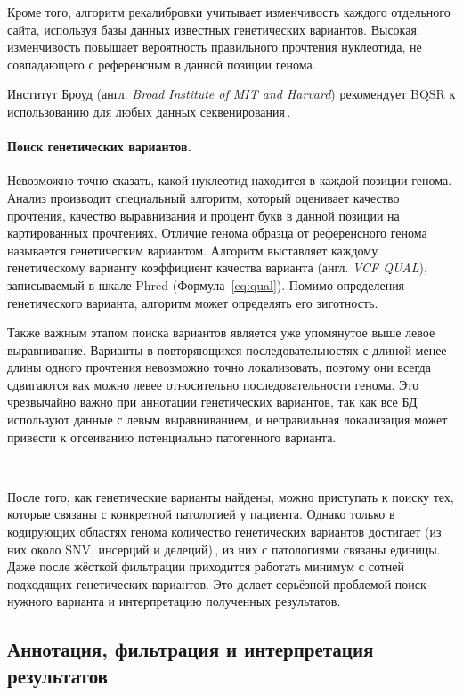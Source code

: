 \documentclass[a4paper,14pt]{extarticle}
\newcommand{\thousands}{тыс.}
\newcommand{\formularef}[1]{Формула~\ref{#1}}
\newcommand{\engterm}[1]{англ. \textenglish{\textit{#1}}}
\begin{document}
Кроме того, алгоритм рекалибровки учитывает изменчивость каждого отдельного сайта, используя базы данных известных генетических вариантов.
Высокая изменчивость повышает вероятность правильного прочтения нуклеотида, не совпадающего с референсным в данной позиции генома.

Институт Броуд (\engterm{Broad Institute of MIT and Harvard}) рекомендует BQSR к использованию для любых данных секвенирования\,\citep{Auwera_2013}.

\paragraph{Поиск генетических вариантов.}
Невозможно точно сказать, какой нуклеотид находится в каждой позиции генома.
Анализ производит специальный алгоритм, который оценивает качество прочтения, качество выравнивания и процент букв в данной позиции на картированных прочтениях.
Отличие генома образца от референсного генома называется генетическим вариантом.
Алгоритм выставляет каждому генетическому варианту коэффициент качества варианта (\engterm{VCF QUAL}), записываемый в шкале Phred (\formularef{eq:qual}).
Помимо определения генетического варианта, алгоритм может определять его зиготность.

Также важным этапом поиска вариантов является уже упомянутое выше левое выравнивание.
Варианты в повторяющихся последовательностях с длиной менее длины одного прочтения невозможно точно локализовать, поэтому они всегда сдвигаются как можно левее относительно последовательности генома.
Это чрезвычайно важно при аннотации генетических вариантов, так как все БД используют данные с левым выравниванием, и неправильная локализация может привести к отсеиванию потенциально патогенного варианта.

~

После того, как генетические варианты найдены, можно приступать к поиску тех, которые связаны с конкретной патологией у пациента.
Однако только в кодирующих областях генома количество генетических вариантов достигает \numprint[\thousands]{100} (из них около  SNV,  инсерций и  делеций)\,\citep{Supernat_2018}, из них с патологиями связаны единицы.
Даже после жёсткой фильтрации приходится работать минимум с сотней подходящих генетических вариантов.
Это делает серьёзной проблемой поиск нужного варианта и интерпретацию полученных результатов.

\subsection{Аннотация, фильтрация и интерпретация результатов}
\end{document}

